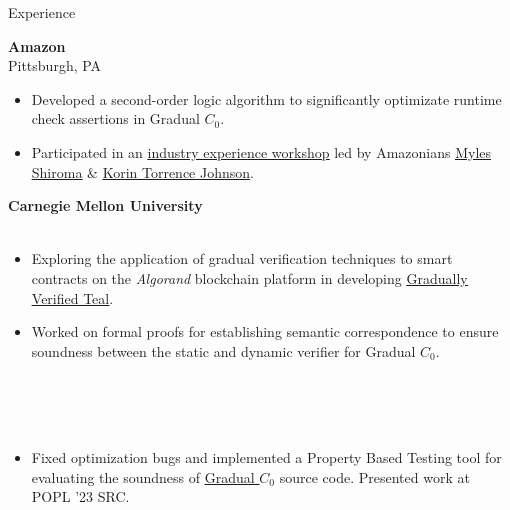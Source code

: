 \begin{rSection}{Experience}
	{\textbf{\large{Amazon}} \hfill \color{darkgray}{06/2023 - 08/2023} 
	\\ \vspace*{1mm}
	 \hfill{Pittsburgh, PA} 
	\\ 
	\color{black}
	\begin{minipage}{40em}
		\begin{itemize}
			\item Developed a second-order logic algorithm to significantly optimizate runtime check assertions in Gradual $C_0$.
			\item Participated in an \href{https://s3d.cmu.edu/sure/index.html}{\underline{industry experience workshop}} led by Amazonians \href{https://www.linkedin.com/in/myles-shiroma-a850a89/}{\underline{Myles Shiroma}} \& \href{https://www.linkedin.com/in/korin-torrence-johnson/}{\underline{Korin Torrence Johnson}}.
		\end{itemize}
	\end{minipage}}

	{\textbf{\large{Carnegie Mellon University}} \hfill \color{darkgray}{06/2022 - Present} 
	\\ \vspace*{1mm}
	 \hfill \color{darkgray}{Pittsburgh, PA} 
	\\ 
	\color{black}
	\begin{minipage}{40em}
		\begin{itemize}
			\item Exploring the application of gradual verification techniques to smart contracts on the \textit{Algorand} blockchain platform in developing \href{https://github.com/gradual-verification/gradual-TEAL}{\underline{Gradually Verified Teal}}.
			\item Worked on formal proofs for establishing semantic correspondence to ensure soundness between the static and dynamic verifier for Gradual $C_0$. 
		\end{itemize}
	\end{minipage}} 
	\\
	\\
	\\
	\color{black}
	\begin{minipage}{40em}
		\begin{itemize}
			\item Fixed optimization bugs and implemented a Property Based Testing tool for evaluating the soundness of \href{https://github.com/gradual-verification/gvc0}{\underline{Gradual $C_0$}} source code. Presented work at POPL '23 SRC.
		\end{itemize}
	\end{minipage}


\end{rSection}
